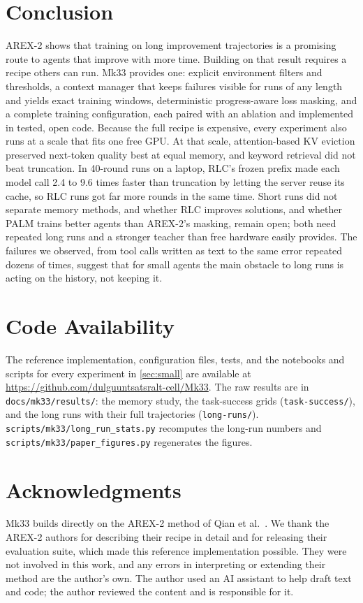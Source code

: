 \documentclass[11pt]{article}
\newcommand{\code}[1]{\texttt{#1}}
\begin{document}
\section{Conclusion}

AREX-2 shows that training on long improvement trajectories is a promising route to agents that improve with more time. Building on that result requires a recipe others can run. Mk33 provides one: explicit environment filters and thresholds, a context manager that keeps failures visible for runs of any length and yields exact training windows, deterministic progress-aware loss masking, and a complete training configuration, each paired with an ablation and implemented in tested, open code. Because the full recipe is expensive, every experiment also runs at a scale that fits one free GPU. At that scale, attention-based KV eviction preserved next-token quality best at equal memory, and keyword retrieval did not beat truncation. In 40-round runs on a laptop, RLC's frozen prefix made each model call 2.4 to 9.6 times faster than truncation by letting the server reuse its cache, so RLC runs got far more rounds in the same time. Short runs did not separate memory methods, and whether RLC improves solutions, and whether PALM trains better agents than AREX-2's masking, remain open; both need repeated long runs and a stronger teacher than free hardware easily provides. The failures we observed, from tool calls written as text to the same error repeated dozens of times, suggest that for small agents the main obstacle to long runs is acting on the history, not keeping it.

\section*{Code Availability}
The reference implementation, configuration files, tests, and the notebooks and scripts for every experiment in \cref{sec:small} are available at \url{https://github.com/dulguuntsatsralt-cell/Mk33}. The raw results are in \code{docs/mk33/results/}: the memory study, the task-success grids (\code{task-success/}), and the long runs with their full trajectories (\code{long-runs/}). \code{scripts/mk33/long\_run\_stats.py} recomputes the long-run numbers and \code{scripts/mk33/paper\_figures.py} regenerates the figures.

\section*{Acknowledgments}
Mk33 builds directly on the AREX-2 method of Qian et al.~\citep{qian2026arex2}. We thank the AREX-2 authors for describing their recipe in detail and for releasing their evaluation suite, which made this reference implementation possible. They were not involved in this work, and any errors in interpreting or extending their method are the author's own. The author used an AI assistant to help draft text and code; the author reviewed the content and is responsible for it.
\end{document}
